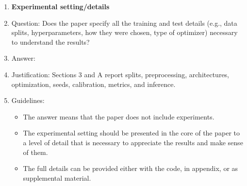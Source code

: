 \documentclass{article}
\begin{document}
\begin{enumerate}
\item {\bf Experimental setting/details}
    \item[] Question: Does the paper specify all the training and test details (e.g., data splits, hyperparameters, how they were chosen, type of optimizer) necessary to understand the results?
    \item[] Answer: \answerYes{}
    \item[] Justification: Sections 3 and A report splits, preprocessing, architectures, optimization, seeds, calibration, metrics, and inference.
    \item[] Guidelines:
    \begin{itemize}
        \item The answer \answerNA{} means that the paper does not include experiments.
        \item The experimental setting should be presented in the core of the paper to a level of detail that is necessary to appreciate the results and make sense of them.
        \item The full details can be provided either with the code, in appendix, or as supplemental material.
    \end{itemize}


\end{enumerate}
\end{document}

